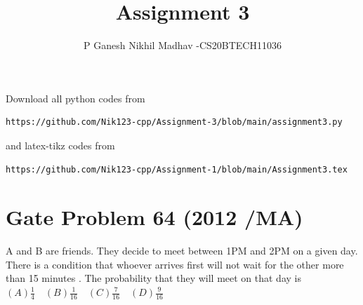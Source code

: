 \documentclass[journal,12pt,twocolumn]{IEEEtran}
\begin{document}
     \def\rightbox#1{\makebox[0in][r]{#1}}
     \def\centbox#1{\makebox[0in]{#1}}
     \def\topbox#1{\raisebox{-\baselineskip}[0in][0in]{#1}}
     \def\midbox#1{\raisebox{-0.5\baselineskip}[0in][0in]{#1}}
\vspace{3cm}
\title{Assignment 3}
\author{P Ganesh Nikhil Madhav -CS20BTECH11036}
\maketitle
\newpage
\bigskip
\renewcommand{\thefigure}{\theenumi}
\renewcommand{\thetable}{\theenumi}
Download all python codes from 
\begin{lstlisting}
https://github.com/Nik123-cpp/Assignment-3/blob/main/assignment3.py
\end{lstlisting}
%
and latex-tikz codes from 
%
\begin{lstlisting}
https://github.com/Nik123-cpp/Assignment-1/blob/main/Assignment3.tex
\end{lstlisting}
\section{ Gate Problem 64 (2012 /MA)}
A and B are friends. They decide to meet between 1PM and 2PM on a given day. There is a condition that whoever arrives first will not wait for the other more than 15 minutes . The probability that they will meet on that day is \newline
\newline
$(A) \frac{1}{4} \quad (B)\frac{1}{16} \quad
(C) \frac{7}{16} \quad (D)\frac{9}{16}$
\end{document}
